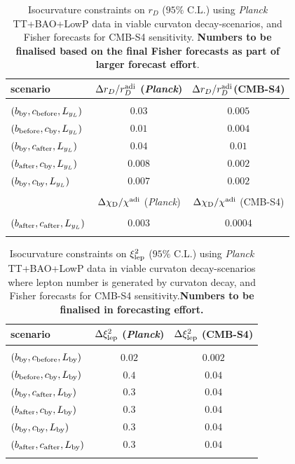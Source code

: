 \begin{table}
\begin{center}
\begin{tabular}
{lcc}\hline \hline {\rm scenario} &  $ \Delta r_D/r_{D}^{\rm adi}$ (\emph{Planck})&$ \Delta r_D/r_{D}^{\rm adi}$(CMB-S4)\\ 
\hline \\
$(b_{\rm by},c_{\rm before},L_{y_{L}})$ & $0.03$&$0.005$\\
$(b_{\rm before},c_{\rm by},L_{y_{L}})$ &  $0.01$ &$0.004$\\
$(b_{\rm by},c_{\rm after},L_{y_{L}})$ &  $0.04$&$0.01$\\
$(b_{\rm after},c_{\rm by},L_{y_{L}})$ & $0.008$&$0.002$\\
$(b_{\rm by},c_{\rm by},L_{y_{L}})$ &  $0.007$&$0.002$\\\hline \hline \\ & $\Delta \chi_{\rm D}/\chi_{\rm }^{\rm adi}$ (\emph{Planck})&$\Delta \chi_{\rm D}/\chi_{\rm }^{\rm adi}$ (CMB-S4) \\\hline \\
$(b_{\rm after},c_{\rm after},L_{y_{L}})$ & $0.003$&$0.0004$\\
\\ 
\end{tabular}
\caption{Isocurvature constraints on $r_D$ ($95\%$ C.L.) using \textit{Planck} TT+BAO+LowP data \cite{Smith/Grin:2015} in viable curvaton decay-scenarios, and Fisher forecasts for CMB-S4 sensitivity. \textbf{Numbers to be finalised based on the final Fisher forecasts as part of larger forecast effort}.
\label{limits_rd}}
\end{center}
\end{table}

\begin{table}
\begin{center}
\begin{tabular}
{lcc}\hline \hline {\rm scenario} &  $\Delta \xi^{2}_{\rm lep}$ (\emph{Planck})&$\Delta \xi^{2}_{\rm lep}$ (CMB-S4) \\ 
\hline \\
$(b_{\rm by},c_{\rm before},L_{\rm by})$ &$0.02$ &$0.002$\\
$(b_{\rm before},c_{\rm by},L_{\rm by})$ &$0.4$  & $0.04$\\
$(b_{\rm by},c_{\rm after},L_{\rm by})$ &$0.3$  &$0.04$\\
$(b_{\rm after},c_{\rm by},L_{\rm by})$ & $0.3$&$0.04$\\
$(b_{\rm by},c_{\rm by},L_{\rm by})$ & $0.3$ & $0.04$\\
$(b_{\rm after},c_{\rm after},L_{\rm by})$ & $0.3$ & $0.04$\\
\\ \hline \hline 
\end{tabular}
\caption{Isocurvature constraints on $\xi_{\rm lep}^{2}$ ($95\%$ C.L.) using \textit{Planck} TT+BAO+LowP data \cite{Smith/Grin:2015} in viable curvaton decay-scenarios where lepton number is generated by curvaton decay, and Fisher forecasts for CMB-S4 sensitivity.\textbf{Numbers to be finalised in forecasting effort.}
\label{limits_xilep}}
\end{center}
\end{table}

